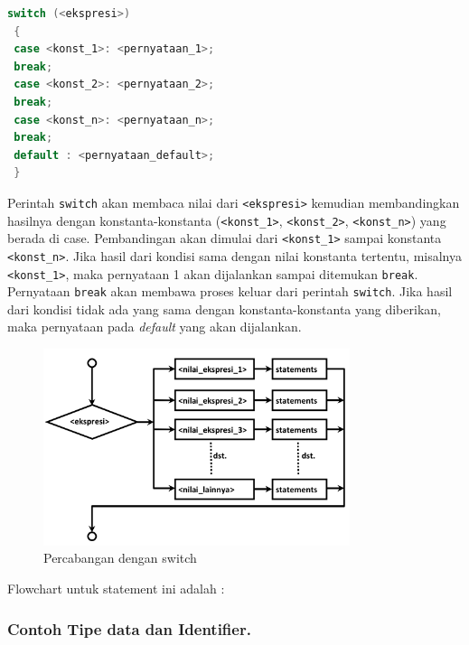 \begin{lstlisting}[language=c++, numbers=none]
 switch (<ekspresi>)
 {
 case <konst_1>: <pernyataan_1>;
 break;
 case <konst_2>: <pernyataan_2>;
 break;
 case <konst_n>: <pernyataan_n>;
 break;
 default : <pernyataan_default>;
 }
\end{lstlisting}

Perintah \texttt{switch} akan membaca nilai dari
\texttt{\textless{}ekspresi\textgreater{}} kemudian membandingkan
hasilnya dengan konstanta-konstanta
(\texttt{\textless{}konst\_1\textgreater{}},
\texttt{\textless{}konst\_2\textgreater{}},
\texttt{\textless{}konst\_n\textgreater{}}) yang berada di case.
Pembandingan akan dimulai dari
\texttt{\textless{}konst\_1\textgreater{}} sampai konstanta
\texttt{\textless{}konst\_n\textgreater{}}. Jika hasil dari kondisi sama
dengan nilai konstanta tertentu, misalnya
\texttt{\textless{}konst\_1\textgreater{}}, maka pernyataan 1 akan
dijalankan sampai ditemukan \texttt{break}. Pernyataan \texttt{break}
akan membawa proses keluar dari perintah \texttt{switch}. Jika hasil
dari kondisi tidak ada yang sama dengan konstanta-konstanta yang
diberikan, maka pernyataan pada \emph{default} yang akan dijalankan.

\begin{figure}[htbp]
\centering
\includegraphics[width=0.8\textwidth]{images/capture2-3.png}
\caption{Percabangan dengan switch}
\end{figure}

Flowchart untuk statement ini adalah :

\subsubsection{Contoh Tipe data dan Identifier.}

